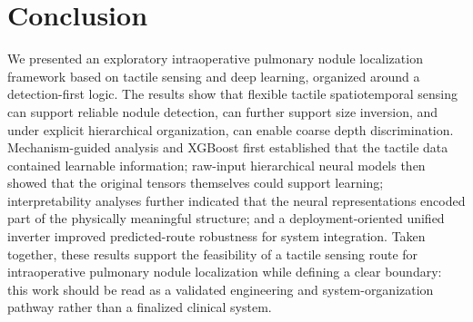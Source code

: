 \section{Conclusion}

We presented an exploratory intraoperative pulmonary nodule localization framework based on tactile sensing and deep learning, organized around a detection-first logic. The results show that flexible tactile spatiotemporal sensing can support reliable nodule detection, can further support size inversion, and under explicit hierarchical organization, can enable coarse depth discrimination. Mechanism-guided analysis and XGBoost first established that the tactile data contained learnable information; raw-input hierarchical neural models then showed that the original tensors themselves could support learning; interpretability analyses further indicated that the neural representations encoded part of the physically meaningful structure; and a deployment-oriented unified inverter improved predicted-route robustness for system integration. Taken together, these results support the feasibility of a tactile sensing route for intraoperative pulmonary nodule localization while defining a clear boundary: this work should be read as a validated engineering and system-organization pathway rather than a finalized clinical system.

